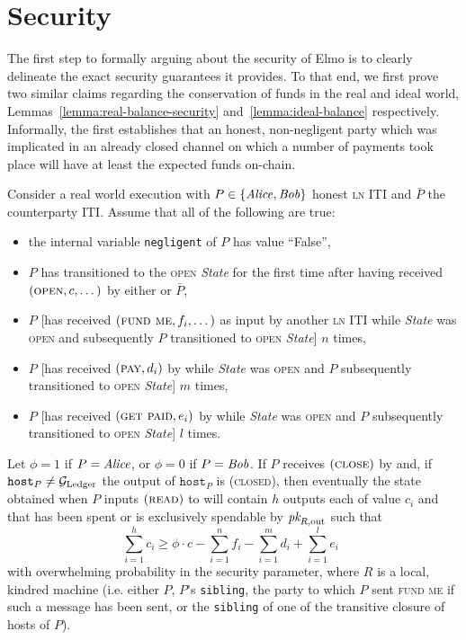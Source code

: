 \section{Security}
  The first step to formally arguing about the security of Elmo is to
  clearly delineate the exact security guarantees it provides. To that end, we
  first prove two similar claims regarding the conservation of funds in the real
  and ideal world, Lemmas~\ref{lemma:real-balance-security}
  and~\ref{lemma:ideal-balance} respectively. Informally, the first establishes that
  an honest, non-negligent party which was implicated in an already closed
  channel on which a number of payments took place will have at least the
  expected funds on-chain.

\begin{lemma}
\label{lemma:real-balance-security}
  Consider a real world execution with $P \in \{\mathit{Alice}, \mathit{Bob}\}$ honest
  \textsc{ln} ITI and $\bar{P}$ the counterparty ITI. Assume that all of the
  following are true:
  \begin{itemize}
    \item the internal variable \texttt{negligent} of $P$ has value ``False'',
    \item $P$ has transitioned to the \textsc{open} \textit{State} for the first
    time after having received $(\textsc{open}, c, \dots)$ by either
    \environment or $\bar{P}$,
    \item $P$ [has received $(\textsc{fund me}, f_i, \dots)$ as input by another
    \textsc{ln} ITI while \textit{State} was \textsc{open} and subsequently $P$
    transitioned to \textsc{open} \textit{State}] $n$ times,
    \item $P$ [has received $(\textsc{pay}, d_i)$ by \environment while
    \textit{State} was \textsc{open} and $P$ subsequently transitioned to
    \textsc{open} \textit{State}] $m$ times,
    \item $P$ [has received $(\textsc{get paid}, e_i)$ by \environment while
    \textit{State} was \textsc{open} and $P$ subsequently transitioned to
    \textsc{open} \textit{State}] $l$ times.
  \end{itemize}
  Let $\phi = 1$ if $P = \mathit{Alice}$, or $\phi = 0$ if $P = \mathit{Bob}$. If $P$ receives
  $(\textsc{close})$ by \environment and, if $\texttt{host}_P \neq \mathcal{G}_{\mathrm{Ledger}}$ the
  output of $\texttt{host}_P$ is (\textsc{closed}), then eventually the state
  obtained when $P$ inputs $(\textsc{read})$ to \ledger will contain $h$ outputs
  each of value $c_i$ and that has been spent or is exclusively spendable by
  $\textit{pk}_{R, \mathrm{out}}$ such that
  \begin{equation}
  \label{lemma:real-balance-security:ineq}
    \sum\limits_{i=1}^h c_i \geq \phi \cdot c - \sum\limits_{i=1}^n f_i -
    \sum\limits_{i=1}^m d_i + \sum\limits_{i=1}^l e_i \enspace
  \end{equation}
  with overwhelming probability in the security parameter, where $R$ is a local,
  kindred machine (i.e. either $P$, $P$'s \texttt{sibling}, the party to which
  $P$ sent \textsc{fund me} if such a message has been sent, or the
  \texttt{sibling} of one of the transitive closure of hosts of $P$).
\end{lemma}

